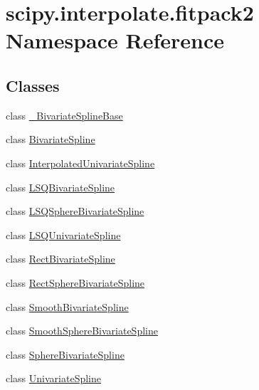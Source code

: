 \hypertarget{namespacescipy_1_1interpolate_1_1fitpack2}{}\section{scipy.\+interpolate.\+fitpack2 Namespace Reference}
\label{namespacescipy_1_1interpolate_1_1fitpack2}
\subsection*{Classes}
\begin{DoxyCompactItemize}
\item 
class \hyperlink{classscipy_1_1interpolate_1_1fitpack2_1_1__BivariateSplineBase}{\+\_\+\+Bivariate\+Spline\+Base}
\item 
class \hyperlink{classscipy_1_1interpolate_1_1fitpack2_1_1BivariateSpline}{Bivariate\+Spline}
\item 
class \hyperlink{classscipy_1_1interpolate_1_1fitpack2_1_1InterpolatedUnivariateSpline}{Interpolated\+Univariate\+Spline}
\item 
class \hyperlink{classscipy_1_1interpolate_1_1fitpack2_1_1LSQBivariateSpline}{L\+S\+Q\+Bivariate\+Spline}
\item 
class \hyperlink{classscipy_1_1interpolate_1_1fitpack2_1_1LSQSphereBivariateSpline}{L\+S\+Q\+Sphere\+Bivariate\+Spline}
\item 
class \hyperlink{classscipy_1_1interpolate_1_1fitpack2_1_1LSQUnivariateSpline}{L\+S\+Q\+Univariate\+Spline}
\item 
class \hyperlink{classscipy_1_1interpolate_1_1fitpack2_1_1RectBivariateSpline}{Rect\+Bivariate\+Spline}
\item 
class \hyperlink{classscipy_1_1interpolate_1_1fitpack2_1_1RectSphereBivariateSpline}{Rect\+Sphere\+Bivariate\+Spline}
\item 
class \hyperlink{classscipy_1_1interpolate_1_1fitpack2_1_1SmoothBivariateSpline}{Smooth\+Bivariate\+Spline}
\item 
class \hyperlink{classscipy_1_1interpolate_1_1fitpack2_1_1SmoothSphereBivariateSpline}{Smooth\+Sphere\+Bivariate\+Spline}
\item 
class \hyperlink{classscipy_1_1interpolate_1_1fitpack2_1_1SphereBivariateSpline}{Sphere\+Bivariate\+Spline}
\item 
class \hyperlink{classscipy_1_1interpolate_1_1fitpack2_1_1UnivariateSpline}{Univariate\+Spline}
\end{DoxyCompactItemize}
